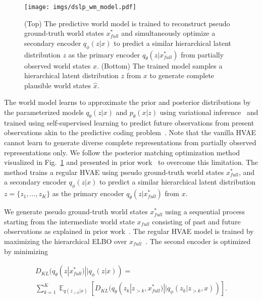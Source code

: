 \documentclass[letterpaper, 10 pt, conference]{ieeeconf}
\DeclareMathOperator*{\E}{\mathbb{E}}
\begin{document}
\begin{figure}\centering
\texttt{[image: imgs/dslp\_wm\_model.pdf]}
\vspace{-3mm}
\caption{(Top) The predictive world model is trained to reconstruct pseudo ground-truth world states $x^\ast_{full}$ and simultaneously optimize a secondary encoder $q_\phi(z|x)$ to predict a similar hierarchical latent distribution $z$ as the primary encoder $q_\theta(z|x^\ast_{full})$ from partially observed world states $x$. (Bottom) The trained model samples a hierarchical latent distribution $z$ from $x$ to generate complete plausible world states $\hat{x}$.}
\label{fig:pred_wm}
\vspace{-5mm}
\end{figure}

The world model learns to approximate the prior and posterior distributions by the parameterized models $q_\theta(z|x)$ and $p_\theta(x|z)$ using variational inference~\cite{kingma2013vae} and trained using self-supervised learning to predict future observations from present observations akin to the predictive coding problem~\cite{marino2019pred_coding_vae_bio}. Note that the vanilla HVAE cannot learn to generate diverse complete representations from partially observed representations only. We follow the posterior matching optimization method visualized in Fig.~\ref{fig:pred_wm} and presented in prior work~\cite{karlsson2023pred_wm} to overcome this limitation. The method trains a regular HVAE using pseudo ground-truth world states $x^\ast_{full}$, and a secondary encoder $q_\phi(z|x)$ to predict a similar hierarchical latent distribution $z = \{z_1, \ldots, z_K\}$ as the primary encoder $q_\theta(z|x^\ast_{full})$ from $x$.

We generate pseudo ground-truth world states $x^\ast_{full}$ using a sequential process starting from the intermediate world state $x_{full}$ consisting of past and future observations as explained in prior work~\cite{karlsson2023pred_wm}.
The regular HVAE model is trained by maximizing the hierarchical ELBO over $x_{full}$~\cite{child2021vdvae, karlsson2023pred_wm}.
The second encoder is optimized by minimizing

\begin{equation}
\begin{gathered}
 D_{KL}(q_\theta(z|x^\ast_{full}) || q_\phi(z|x)) = \\
 \sum^K_{k=1} \E_{q(z_{>k}|x)} \left[ D_{KL}( q_\theta(z_k | z_{>k}, x^\ast_{full}) || q_\phi(z_k | z_{>k}, x)) \right].
\end{gathered}
\end{equation}
\end{document}
